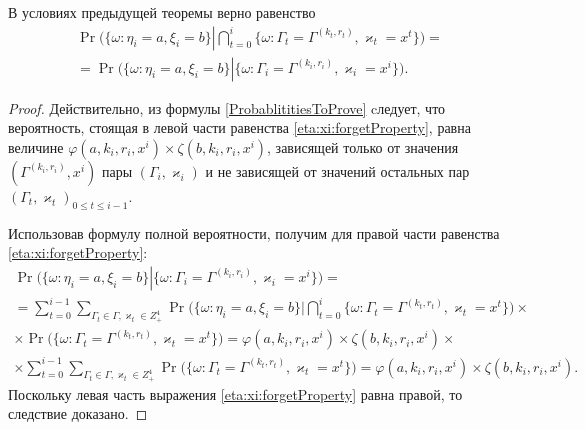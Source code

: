 \documentclass[a4paper,12pt,russian]{extarticle}
\begin{document}
\begin{corollary}\label{eta:xi:forget}
В условиях предыдущей теоремы верно равенство
\begin{multline}
\Pr \biggl(\{ \omega \colon \eta_i = a, \xi_i=b\} \left|\bigcap_{t=0}^{i}\{\omega\colon \Gamma_t=\Gamma^{(k_t,r_t)}, \varkappa_t=x^t\}\right.\biggr)=\\
=\Pr \biggl(\{ \omega \colon \eta_i = a, \xi_i=b\} \left|\{\omega\colon \Gamma_i=\Gamma^{(k_i,r_i)}, \varkappa_i=x^i\}\right.\biggr).
\label{eta:xi:forgetProperty}
\end{multline}
\end{corollary}
\begin{proof}
Действительно, из формулы \eqref{ProbablititiesToProve} cледует, что вероятность, стоящая в левой части равенства \eqref{eta:xi:forgetProperty}, равна величине $\varphi(a,k_i,r_i,x^i)\times \zeta(b,k_i,r_i,x^i)$, зависящей только от значения $(\Gamma^{(k_i,r_i)},x^i)$ пары $(\Gamma_i,\varkappa_i)$ и не зависящей от значений остальных пар $(\Gamma_t,\varkappa_t)_{0\leqslant t \leqslant i-1}$. 

Использовав формулу полной вероятности, получим для правой части равенства \eqref{eta:xi:forgetProperty}:
\begin{multline*}
 \Pr \biggl(\{ \omega \colon \eta_i = a, \xi_i=b\} \left|\{\omega\colon \Gamma_i=\Gamma^{(k_i,r_i)}, \varkappa_i=x^i\}\right.\biggr) = \\ = \sum_{t=0}^{i-1}\sum_{\Gamma_t\in \Gamma, \varkappa_t \in Z^4_+}\Pr \biggl(\{ \omega \colon \eta_i = a, \xi_i=b\} \biggl|\bigcap_{t=0}^{i}\{\omega\colon \Gamma_t=\Gamma^{(k_t,r_t)}, \varkappa_t=x^t\}\biggr) \times \\ \times \Pr \biggl(\{ \omega \colon  \Gamma_t=\Gamma^{(k_t,r_t)}, \varkappa_t=x^t\}\biggr) = 
 \varphi(a,k_i,r_i,x^i)\times \zeta(b,k_i,r_i,x^i) \times \\ \times \sum_{t=0}^{i-1}\sum_{\Gamma_t\in \Gamma, \varkappa_t \in Z^4_+}\Pr \biggl(\{ \omega \colon  \Gamma_t=\Gamma^{(k_t,r_t)}, \varkappa_t=x^t\}\biggr) =\varphi(a,k_i,r_i,x^i)\times \zeta(b,k_i,r_i,x^i).
\end{multline*}
Поскольку левая часть выражения \eqref{eta:xi:forgetProperty} равна правой, то следствие доказано. 
\end{proof}
\end{document}
